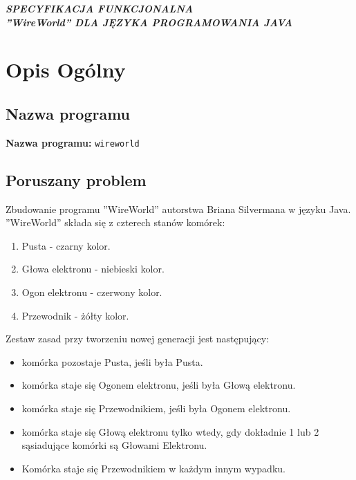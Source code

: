 \documentclass[a4paper, 12pt]{article}
\newcommand{\mainmatter}{\clearpage \cfoot{\thepage\ of \pageref{LastPage}}
\pagenumbering{arabic}}
\begin{document}
	\begin{titlepage}
		
		\begin{center}
    	\vspace{5cm}
    		\Large\textit{\textbf{SPECYFIKACJA FUNKCJONALNA 
    		\\''WireWorld'' DLA JĘZYKA PROGRAMOWANIA JAVA}}\\ 
		\vspace{5cm}
		\end{center} 


		
	\end{titlepage}
\newpage
\mainmatter
\setlength{\headheight}{15pt}
\doublespacing
\tableofcontents
\newpage

	\section{Opis Ogólny}
		\subsection{Nazwa programu} 
			\textbf{Nazwa programu:} \texttt{wireworld}
			
		\subsection{Poruszany problem}
		\hspace*{1cm} Zbudowanie programu ''WireWorld'' autorstwa Briana Silvermana w języku Java.\newline
			\hspace*{1cm} ''WireWorld'' składa się z czterech stanów komórek:
			
		\begin{enumerate}
			\item Pusta - czarny kolor.
			\item Głowa elektronu - niebieski kolor. 
			\item Ogon elektronu - czerwony kolor.
			\item Przewodnik - żółty kolor.
		\end{enumerate}					
		
			\hspace*{1cm} Zestaw zasad przy tworzeniu nowej generacji  jest następujący:

		\begin{itemize}
			\item komórka pozostaje Pusta, jeśli była Pusta.
			\item komórka staje się Ogonem elektronu, jeśli była Głową elektronu.
			\item komórka staje się Przewodnikiem, jeśli była Ogonem elektronu.
			\item komórka staje się Głową elektronu tylko wtedy, gdy dokładnie 1 lub 2 sąsiadujące komórki są Głowami Elektronu.
			\item Komórka staje się Przewodnikiem w każdym innym wypadku.
		\end{itemize}
		
\end{document}
